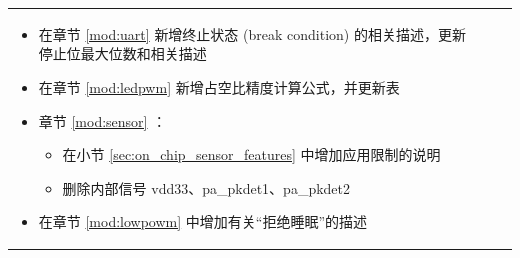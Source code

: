 \begin{longtable}[l]{ | m{2cm} | m{1.5cm} | m{12cm} | }
\begin{itemize}
            \item 在章节 \ref{mod:uart} \textit{\nameref{mod:uart}} 新增终止状态 (break condition) 的相关描述，更新停止位最大位数和相关描述%
            \item 在章节 \ref{mod:ledpwm} \textit{\nameref{mod:ledpwm}} 新增占空比精度计算公式，并更新表 \textit{\nameref{tab:ledc-common-freq-res}} %
            \item 章节 \ref{mod:sensor} \textit{\nameref{mod:sensor}}：
            \begin{itemize}
                \item 在小节 \ref{sec:on_chip_sensor_features} \textit{\nameref{sec:on_chip_sensor_features}} 中增加应用限制的说明
                \item 删除内部信号 vdd33、pa\_pkdet1、pa\_pkdet2
            \end{itemize}
            \item 在章节 \ref{mod:lowpowm} \textit{\nameref{mod:lowpowm}} 中增加有关“拒绝睡眠”的描述 %
        \end{itemize}


\end{longtable}

